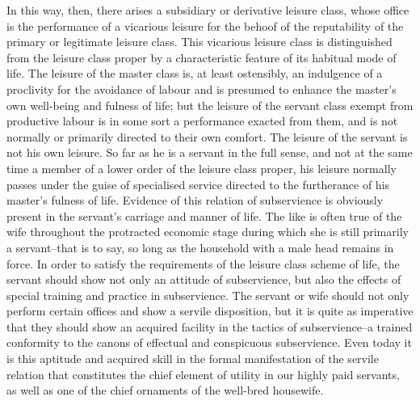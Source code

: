\documentclass[12pt]{report}
\begin{document}
In this way, then, there arises a subsidiary or derivative leisure
class, whose office is the performance of a vicarious leisure for the
behoof of the reputability of the primary or legitimate leisure class.
This vicarious leisure class is distinguished from the leisure class
proper by a characteristic feature of its habitual mode of life. The
leisure of the master class is, at least ostensibly, an indulgence of
a proclivity for the avoidance of labour and is presumed to enhance
the master's own well-being and fulness of life; but the leisure of
the servant class exempt from productive labour is in some sort a
performance exacted from them, and is not normally or primarily directed
to their own comfort. The leisure of the servant is not his own leisure.
So far as he is a servant in the full sense, and not at the same time
a member of a lower order of the leisure class proper, his leisure
normally passes under the guise of specialised service directed to the
furtherance of his master's fulness of life. Evidence of this relation
of subservience is obviously present in the servant's carriage and
manner of life. The like is often true of the wife throughout the
protracted economic stage during which she is still primarily a
servant--that is to say, so long as the household with a male head
remains in force. In order to satisfy the requirements of the leisure
class scheme of life, the servant should show not only an attitude of
subservience, but also the effects of special training and practice
in subservience. The servant or wife should not only perform certain
offices and show a servile disposition, but it is quite as imperative
that they should show an acquired facility in the tactics of
subservience--a trained conformity to the canons of effectual and
conspicuous subservience. Even today it is this aptitude and acquired
skill in the formal manifestation of the servile relation that
constitutes the chief element of utility in our highly paid servants, as
well as one of the chief ornaments of the well-bred housewife.
\end{document}

